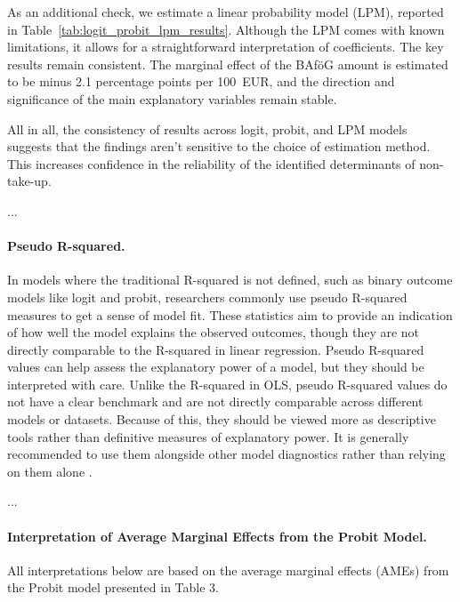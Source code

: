 As an additional check, we estimate a linear probability model (LPM), reported in Table~\ref{tab:logit_probit_lpm_results}. 
Although the LPM comes with known limitations, it allows for a straightforward interpretation of coefficients. 
The key results remain consistent. The marginal effect of the BAföG amount is estimated to be minus 2.1 percentage points per 100~EUR, and the direction and significance of the main explanatory variables remain stable.



All in all, the consistency of results across logit, probit, and LPM models suggests that the findings aren't sensitive to the choice of estimation method. This increases confidence in the reliability of the identified determinants of non-take-up.


...

\paragraph{Pseudo R-squared.} In models where the traditional R-squared is not defined, such as binary outcome models like logit and probit, researchers commonly use pseudo R-squared measures to get a sense of model fit. These statistics aim to provide an indication of how well the model explains the observed outcomes, though they are not directly comparable to the R-squared in linear regression. Pseudo R-squared values can help assess the explanatory power of a model, but they should be interpreted with care. Unlike the R-squared in OLS, pseudo R-squared values do not have a clear benchmark and are not directly comparable across different models or datasets. Because of this, they should be viewed more as descriptive tools rather than definitive measures of explanatory power. It is generally recommended to use them alongside other model diagnostics rather than relying on them alone \citep{ozili_acceptable_2023}.





...

\paragraph{Interpretation of Average Marginal Effects from the Probit Model.} All interpretations below are based on the average marginal effects (AMEs) from the Probit model presented in Table 3.

